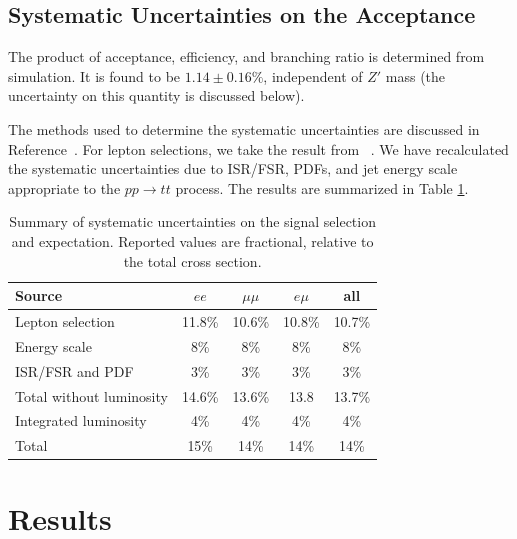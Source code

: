 
\subsection{Systematic Uncertainties on the Acceptance}
\label{sec:sssystematics}

The product of acceptance, efficiency, and branching ratio is determined
from simulation.  It is found to be $1.14 \pm 0.16 \%$, independent of $Z'$ 
mass (the uncertainty on this quantity is discussed below).

The methods used to determine the systematic uncertainties are discussed in Reference~\cite{ssnote1}.
For lepton selections, we take the result from ~\cite{ssnote1}.
We have recalculated the systematic uncertainties due to ISR/FSR, PDFs, and jet energy scale
appropriate to the $pp \to tt$ process.  The results are 
summarized 
in Table \ref{tab:systSumm}.

\begin{table}[h]
\begin{center}
\begin{tabular}{lcccc}\hline
Source 					& $ee$		& $\mu\mu$		& $e\mu$			& all \\ \hline
Lepton selection			& 11.8\%		& 10.6\%		& 10.8\%			& 10.7\% \\
Energy scale				& 8\%		& 8\%		& 8\%			& 8\% \\
ISR/FSR and PDF				& 3\%		& 3\%		& 3\%			& 3\% 	\\
Total without luminosity		& 14.6\%		& 13.6\%		& 13.8	& 13.7\%	\\ \hline
Integrated luminosity			& 4\%		& 4\%		& 4\%			& 4\%	\\ \hline
Total & 15\% & 14\% & 14\%  & 14\% \\
\hline
\end{tabular}
\caption{\small\label{tab:systSumm}Summary of systematic uncertainties on the signal selection and
expectation. Reported values are fractional, relative to the total cross section.}
\end{center}
\end{table}

\section{Results}
\label{sec:ssresults}

